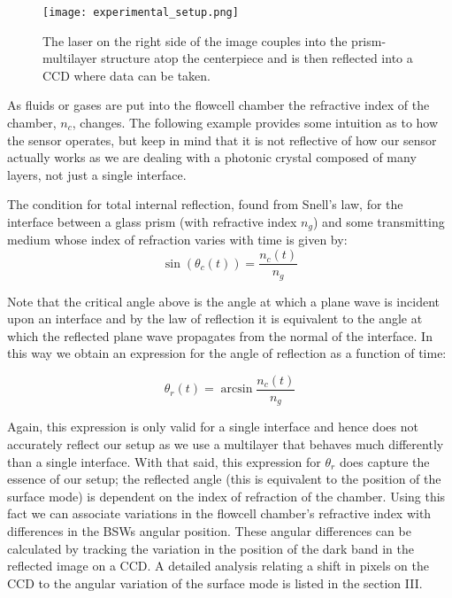 \begin{flushleft}
	\begin{figure}[h]
		\begin{center}
			\texttt{[image: experimental\_setup.png]}
			\caption{The laser on the right side of the image couples into the prism-multilayer structure atop the centerpiece and is then reflected into a CCD where data can be taken.}
			\label{fig:setup}
		\end{center}
	\end{figure}

	As fluids or gases are put into the flowcell chamber the refractive index of the chamber, $n_c$, changes. The following example provides some intuition as to how the sensor operates, but keep in mind that it is not reflective of how our sensor actually works as we are dealing with a photonic crystal composed of many layers, not just a single interface. 
	
	\hspace{0.15in}
	The condition for total internal reflection, found from Snell's law, for the interface between a glass prism (with refractive index $n_g$) and some transmitting medium whose index of refraction varies with time is given by:
	\[
		\sin\left({\theta_c(t)}\right) = \frac{n_c(t)}{n_g}
	\]

	Note that the critical angle above is the angle at which a plane wave is incident upon an interface and by the law of reflection it is equivalent to the angle at which the reflected plane wave propagates from the normal of the interface. In this way we obtain an expression for the angle of reflection as a function of time:

	\[
		\theta_r(t) = \arcsin{\frac{n_c(t)}{n_g}}
	\]

	Again, this expression is only valid for a single interface and hence does not accurately reflect our setup as we use a multilayer that behaves much differently than a single interface. With that said, this expression for $\theta_r$ does capture the essence of our setup; the reflected angle (this is equivalent to the position of the surface mode) is dependent on the index of refraction of the chamber. Using this fact we can associate variations in the flowcell chamber's refractive index with differences in the BSWs angular position. These angular differences can be calculated by tracking the variation in the position of the dark band in the reflected image on a CCD. A detailed analysis relating a shift in pixels on the CCD to the angular variation of the surface mode is listed in the section III.


\end{flushleft}
